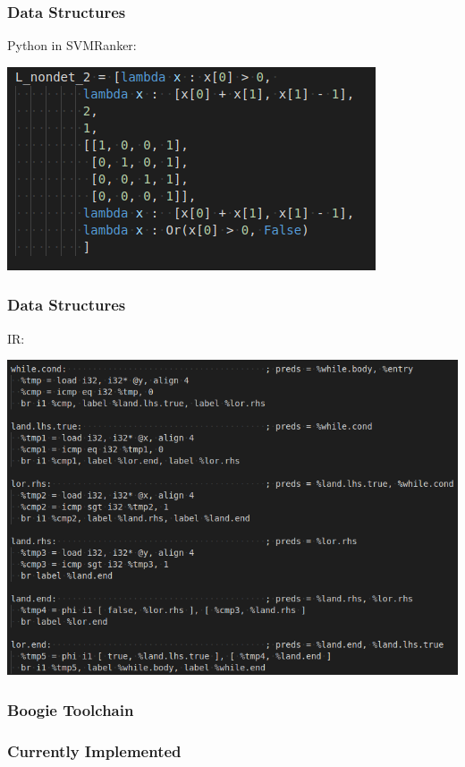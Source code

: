 \documentclass[11pt]{beamer}
\begin{document}
\begin{frame}\frametitle{Data Structures}

Python in SVMRanker: 
\begin{center}
\includegraphics[scale=0.4]{pyds.png}
\end{center}

\end{frame}


\begin{frame}\frametitle{Data Structures}


IR: 
\begin{center}
\includegraphics[scale=0.4]{ir.png}
\end{center}

\end{frame}

\begin{frame}\frametitle{Boogie Toolchain}

\end{frame}

\begin{frame}\frametitle{Currently Implemented}

\end{frame}
\end{document}
